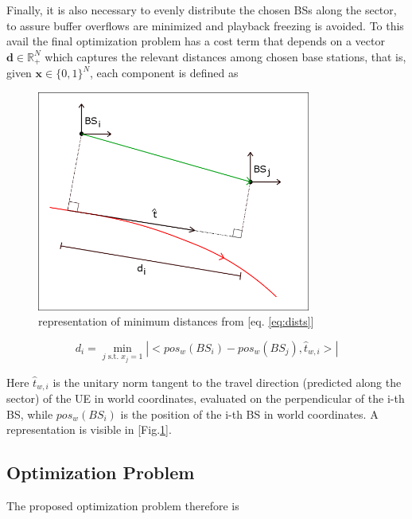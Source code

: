 \documentclass[conference,10pt]{IEEEtran}
\begin{document}
Finally, it is also necessary to evenly distribute the chosen BSs along the sector, to assure buffer overflows are minimized and playback freezing is avoided. To this avail the final optimization problem has a cost term that depends on a vector $\mathbf{d} \in \mathbb{R}_+^N$ which captures the relevant distances among chosen base stations, that is, given $\mathbf{x} \in \{0,1\}^N$, each component is defined as

\begin{figure}[t]
	\centering
	\includegraphics[width=9cm]{BS_distance.png}
	\caption{representation of minimum distances from [eq. \ref{eq:dists}] }
	\label{fig:min_dists}
\end{figure}

\begin{equation}
\label{eq:dists}
d_i = \min_{j \textrm{ s.t. }x_j = 1} |<pos_w(BS_i) - pos_w(BS_j), \hat{t}_{w, i}>|
\end{equation} 

Here $\hat{t}_{w, i}$ is the unitary norm tangent to the travel direction (predicted along the sector) of the UE in world coordinates, evaluated on the perpendicular of the i-th BS, while $pos_w(BS_i)$ is the position of the i-th BS in world coordinates. A representation is visible in [Fig.\ref{fig:min_dists}].

\subsection{Optimization Problem}

The proposed optimization problem therefore is
\end{document}
